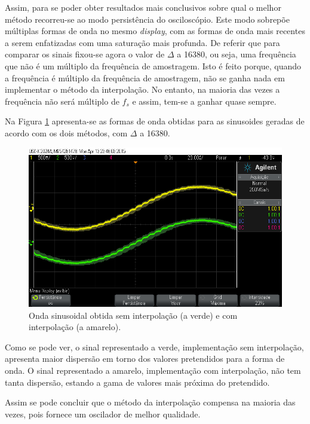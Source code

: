 \documentclass[11pt]{article}
\numberwithin{equation}{section}
\begin{document}
Assim, para se poder obter resultados mais conclusivos sobre qual o melhor método recorreu-se ao modo persistência do osciloscópio. Este modo sobrepõe múltiplas formas de onda no mesmo \textit{display}, com as formas de onda mais recentes a serem enfatizadas com uma saturação mais profunda. De referir que para comparar os sinais fixou-se agora o valor de $\Delta$ a 16380, ou seja, uma frequência que não é um múltiplo da frequência de amostragem. Isto é feito porque, quando a frequência é múltiplo da frequência de amostragem, não se ganha nada em implementar o método da interpolação. No entanto, na maioria das vezes a frequência não será múltiplo de $f_s$ e assim, tem-se a ganhar quase sempre. 

Na Figura \ref{fig:AE1} apresenta-se as formas de onda obtidas para as sinusoides geradas de acordo com os dois métodos, com $\Delta$ a 16380.

\begin{figure}[H]
	\centering
	\includegraphics[keepaspectratio=true, scale=0.33]{exps/diferenca1}
	\caption{Onda sinusoidal obtida sem interpolação (a verde) e com interpolação (a amarelo).}
	\vspace{-0.8em}
	\label{fig:AE1}
\end{figure}

Como se pode ver, o sinal representado a verde, implementação sem interpolação, apresenta maior dispersão em torno dos valores pretendidos para a forma de onda. O sinal representado a amarelo, implementação com interpolação, não tem tanta dispersão, estando a gama de valores mais próxima do pretendido. 

Assim se pode concluir que o método da interpolação compensa na maioria das vezes, pois fornece um oscilador de melhor qualidade.
\end{document}

